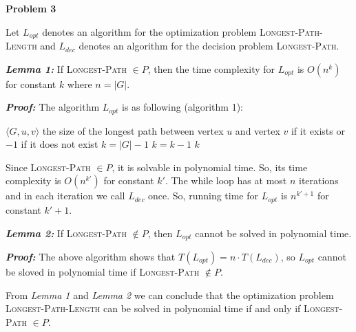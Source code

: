 \documentclass[12pt,letterpaper]{article}
\def\pp{\par\noindent}
\newcommand{\problem}[1]{ \bigskip \pp \textbf{Problem #1}\par}
\newcommand{\lemma}[1]{\pp\textbf{\textit{Lemma #1:}}}
\newcommand{\proof}{\pp\textbf{\textit{Proof: }}}
\begin{document}
\problem{3}
Let $L_{opt}$ denotes an algorithm for the optimization problem \textsc{Longest-Path-Length} and $L_{dec}$ denotes an algorithm for the decision problem \textsc{Longest-Path}.\par
\lemma{1} If \textsc{Longest-Path} $\in P$, then the time complexity for $L_{opt}$ is $O(n^k)$ for constant $k$ where $n=|G|$.
\proof The algorithm $L_{opt}$ is as following (algorithm 1):
\begin{algorithm}
	\caption{$L_{opt}$}
\begin{algorithmic}[1]
	\REQUIRE $\langle G, u, v\rangle$
	\ENSURE the size of the longest path between vertex $u$ and vertex $v$ if it exists or $-1$ if it does not exist
	\STATE $k = |G| - 1$
	\STATE $k=k-1$
	\ENDWHILE
	\RETURN $k$
\end{algorithmic}
\end{algorithm}\par
Since \textsc{Longest-Path} $\in P$, it is solvable in polynomial time. So, its time complexity is $O(n^{k'})$ for constant $k'$. The while loop has at most $n$ iterations and in each iteration we call $L_{dec}$ once. So, running time for $L_{opt}$ is $n^{k'+1}$ for constant $k'+1$.
\lemma{2} If \textsc{Longest-Path} $\notin P$, then $L_{opt}$ cannot be solved in polynomial time.
\proof The above algorithm shows that $T(L_{opt})=n\cdot T(L_{dec})$, so $L_{opt}$ cannot be sloved in polynomial time if \textsc{Longest-Path} $\notin P$.\par
From \textit{Lemma 1} and \textit{Lemma 2} we can conclude that the optimization problem \textsc{Longest-Path-Length} can be solved in polynomial time if and only if \textsc{Longest-Path} $\in P$.
\end{document}
